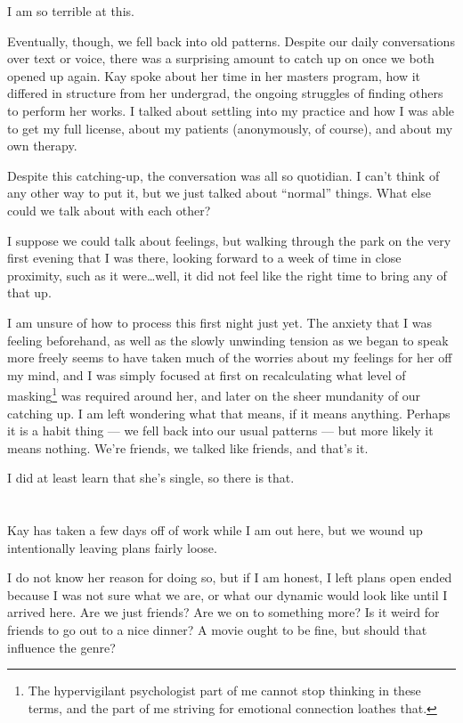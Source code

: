I am so terrible at this.

Eventually, though, we fell back into old patterns. Despite our daily conversations over text or voice, there was a surprising amount to catch up on once we both opened up again. Kay spoke about her time in her masters program, how it differed in structure from her undergrad, the ongoing struggles of finding others to perform her works. I talked about settling into my practice and how I was able to get my full license, about my patients (anonymously, of course), and about my own therapy.

Despite this catching-up, the conversation was all so quotidian. I can't think of any other way to put it, but we just talked about ``normal'' things. What else could we talk about with each other?

I suppose we could talk about feelings, but walking through the park on the very first evening that I was there, looking forward to a week of time in close proximity, such as it were\ldots well, it did not feel like the right time to bring any of that up.

I am unsure of how to process this first night just yet. The anxiety that I was feeling beforehand, as well as the slowly unwinding tension as we began to speak more freely seems to have taken much of the worries about my feelings for her off my mind, and I was simply focused at first on recalculating what level of masking\footnote{The hypervigilant psychologist part of me cannot stop thinking in these terms, and the part of me striving for emotional connection loathes that.} was required around her, and later on the sheer mundanity of our catching up. I am left wondering what that means, if it means anything. Perhaps it is a habit thing --- we fell back into our usual patterns --- but more likely it means nothing. We're friends, we talked like friends, and that's it.

I did at least learn that she's single, so there is that.

\section{}

Kay has taken a few days off of work while I am out here, but we wound up intentionally leaving plans fairly loose.

I do not know her reason for doing so, but if I am honest, I left plans open ended because I was not sure what we are, or what our dynamic would look like until I arrived here. Are we just friends? Are we on to something more? Is it weird for friends to go out to a nice dinner? A movie ought to be fine, but should that influence the genre?

